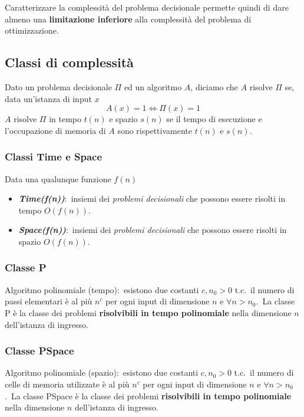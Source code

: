 Caratterizzare la complessità del problema decisionale permette quindi di dare almeno una \textbf{limitazione inferiore} alla complessità del problema di ottimizzazione.\

\subsection{Classi di complessità}

Dato un problema decisionale $\Pi$ ed un algoritmo $A$, diciamo che $A$ risolve $\Pi$ se, data un'istanza di input $x$
\[A(x) = 1 \Leftrightarrow \Pi(x) = 1\]
$A$ risolve $\Pi$ in tempo $t(n)$ e spazio $s(n)$ se il tempo di esecuzione e l'occupazione di memoria di $A$ sono rispettivamente $t(n)$ e $s(n)$.\

\subsubsection{Classi Time e Space}

Data una qualunque funzione $f(n)$

\begin{itemize}
    \item \textbf{\textit{Time(f(n))}}:\ insiemi dei \textit{problemi decisionali} che possono essere risolti in tempo $O(f(n))$.\
    \item \textbf{\textit{Space(f(n))}}:\ insiemi dei \textit{problemi decisionali} che possono essere risolti in spazio $O(f(n))$.\
\end{itemize}

\subsubsection{Classe P}

Algoritmo polinomiale (tempo):\ esistono due costanti $c, n_0 >0$ t.c.\ il numero di passi elementari è al più $n^c$ per ogni input di dimensione $n$ e $\forall n>n_0$.\
La classe P è la classe dei problemi \textbf{risolvibili in tempo polinomiale} nella dimensione $n$ dell'istanza di ingresso.\

\subsubsection{Classe PSpace}

Algoritmo polinomiale (spazio):\ esistono due costanti $c, n_0 >0$ t.c.\ il numero di celle di memoria utilizzate è al più $n^c$ per ogni input di dimensione $n$ e $\forall n>n_0$.\
La classe PSpace è la classe dei problemi \textbf{risolvibili in tempo polinomiale} nella dimensione $n$ dell'istanza di ingresso.\

